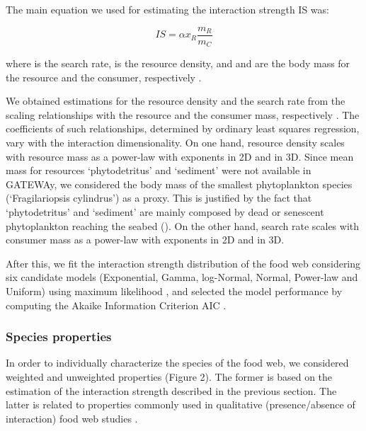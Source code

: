 \documentclass[gc, manuscript]{copernicus}
\begin{document}
The main equation we used for estimating the interaction strength IS
was:

\begin{equation}
IS = \alpha x_R \frac{m_R}{m_C}
\end{equation}

where \vec{\alpha} is the search rate,  is the resource
density, and  and  are the body mass for the resource
and the consumer, respectively \citep{Pawar2012}.

We obtained estimations for the resource density and the search rate
from the scaling relationships with the resource and the consumer mass,
respectively \citep{Pawar2012}. The coefficients of such relationships,
determined by ordinary least squares regression, vary with the
interaction dimensionality. On one hand, resource density scales with
resource mass as a power-law with exponents  in
2D and  in 3D. Since mean mass for resources
`phytodetritus' and `sediment' were not available in GATEWAy, we
considered the body mass of the smallest phytoplankton species
(`Fragilariopsis cylindrus') as a proxy. This is justified by the fact
that `phytodetritus' and `sediment' are mainly composed by dead or
senescent phytoplankton reaching the seabed (\citet{Wolanski2011}). On
the other hand, search rate scales with consumer mass as a power-law
with exponents  in 2D and 
in 3D.

After this, we fit the interaction strength distribution of the food web
considering six candidate models (Exponential, Gamma, log-Normal,
Normal, Power-law and Uniform) using maximum likelihood
\citep{McCallum2008}, and selected the model performance by computing
the Akaike Information Criterion AIC \citep{Burnham2002}.

\subsubsection{Species properties}

In order to individually characterize the species of the food web, we
considered weighted and unweighted properties (Figure 2). The former is
based on the estimation of the interaction strength described in the
previous section. The latter is related to properties commonly used in
qualitative (presence/absence of interaction) food web studies
\citep{Martinez1991, Dunne2002, Borrelli2014}.
\end{document}
